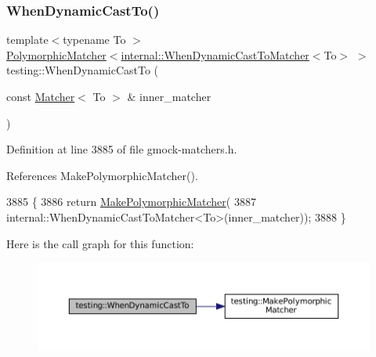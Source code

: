 \subsubsection{\texorpdfstring{When\+Dynamic\+Cast\+To()}{WhenDynamicCastTo()}}
{\footnotesize\ttfamily template$<$typename To $>$ \\
\hyperlink{classtesting_1_1PolymorphicMatcher}{Polymorphic\+Matcher}$<$\hyperlink{classtesting_1_1internal_1_1WhenDynamicCastToMatcher}{internal\+::\+When\+Dynamic\+Cast\+To\+Matcher}$<$To$>$ $>$ testing\+::\+When\+Dynamic\+Cast\+To (\begin{DoxyParamCaption}\item[{const \hyperlink{classtesting_1_1Matcher}{Matcher}$<$ To $>$ \&}]{inner\+\_\+matcher }\end{DoxyParamCaption})\hspace{0.3cm}{\ttfamily [inline]}}



Definition at line 3885 of file gmock-\/matchers.\+h.



References Make\+Polymorphic\+Matcher().


\begin{DoxyCode}
3885                                                     \{
3886   \textcolor{keywordflow}{return} \hyperlink{namespacetesting_a667ca94f190ec2e17ee2fbfdb7d3da04}{MakePolymorphicMatcher}(
3887       internal::WhenDynamicCastToMatcher<To>(inner\_matcher));
3888 \}
\end{DoxyCode}
Here is the call graph for this function\+:
\nopagebreak
\begin{figure}[H]
\begin{center}
\leavevmode
\includegraphics[width=350pt]{namespacetesting_aabfc320cc132d0a1da2a255b45a17b7a_cgraph}
\end{center}
\end{figure}
\mbox{\label{namespacetesting_a01468e3e641c72a2efb605b4c34675ee}} 
